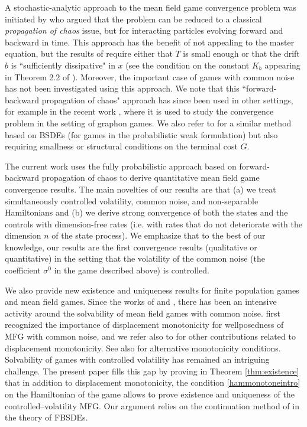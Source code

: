 \documentclass[11pt,reqno]{amsart}
\numberwithin{equation}{section}
\theoremstyle{definition}
\begin{document}
A stochastic-analytic approach to the mean field game convergence problem was initiated by \citet{laurieretangpi} who argued that the problem can be reduced to a classical \emph{propagation of chaos} issue, but for interacting particles evolving forward and backward in time.
This approach has the benefit of not appealing to the master equation, but the results of \cite{laurieretangpi} require either that $T$ is small enough or that the drift $b$ is ``sufficiently dissipative" in $x$ (see the condition on the constant $K_b$ appearing in Theorem 2.2 of \cite{laurieretangpi}).
Moreover, the important case of games with common noise has not been investigated using this approach. We note that this ``forward-backward propagation of chaos" approach has since been used in other settings, for example in the recent work \cite{bayraktar2022propagation}, where it is used to study the convergence problem in the setting of graphon games.
We also refer to \cite{possamai2021non} for a similar method based on BSDEs (for games in the probabilistic weak formulation) but also requiring smallness or structural conditions on the terminal cost $G$. 


The current work uses the fully probabilistic approach based on forward-backward propagation of chaos to derive quantitative mean field game convergence results.
The main novelties of our results are that (a) we treat simultaneously controlled volatility, common noise, and non-separable Hamiltonians and (b) we derive strong convergence of both the states and the controls with dimension-free rates (i.e. with rates that do not deteriorate with the dimension $n$ of the state process).
We emphasize that to the best of our knowledge, our results are the first convergence results (qualitative or quantitative) in the setting that the volatility of the common noise (the coefficient $\sigma^0$ in the game described above) is controlled.

We also provide new existence and uniqueness results for finite population games and mean field games.
Since the works of \citet{cardaliaguet2019master} and \citet{Car-Del-Lack16}, there has been an intensive activity around the solvability of mean field games with common noise.
\citet{ahuja2016} first recognized the importance of displacement monotonicity for wellposedness of MFG with common noise, and we refer also to  \cite{Gang-Mes22,Gang-Mes-Mou-Zhang22,Mes-Mou21} for other contributions related to displacement monotonicity. See also \cite{Mou-Zhang22} for alternative monotonicity conditions.
Solvability of games with controlled volatility has remained an intriguing challenge.
The present paper fills this gap by proving in Theorem \ref{thm:existence} that in addition to displacement monotonicity, the condition \eqref{hammonotoneintro} on the Hamiltonian of the game allows to prove existence and uniqueness of the controlled--volatility MFG.
Our argument relies on the continuation method of \cite{pengwumonotone} in the theory of FBSDEs.
\end{document}
